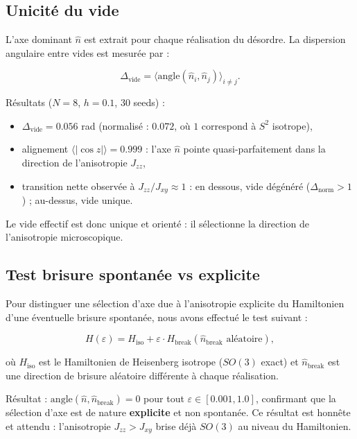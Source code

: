 \documentclass[11pt]{article}
\begin{document}
\subsection{Unicité du vide}

L'axe dominant $\hat{n}$ est extrait pour chaque réalisation du désordre. La dispersion angulaire entre vides est mesurée par :

\[
\Delta_{\mathrm{vide}} = \langle \mathrm{angle}(\hat{n}_i, \hat{n}_j) \rangle_{i \neq j}.
\]

Résultats ($N=8$, $h=0.1$, 30 seeds) :

\begin{itemize}
\item $\Delta_{\mathrm{vide}} = 0.056$ rad (normalisé : $0.072$, où $1$ correspond à $S^2$ isotrope),
\item alignement $\langle |\cos z| \rangle = 0.999$ : l'axe $\hat{n}$ pointe quasi-parfaitement dans la direction de l'anisotropie $J_{zz}$,
\item transition nette observée à $J_{zz}/J_{xy} \approx 1$ : en dessous, vide dégénéré ($\Delta_{\mathrm{norm}} > 1$) ; au-dessus, vide unique.
\end{itemize}

Le vide effectif est donc unique et orienté : il sélectionne la direction de l'anisotropie microscopique.

\subsection{Test brisure spontanée vs explicite}

Pour distinguer une sélection d'axe due à l'anisotropie explicite du Hamiltonien d'une éventuelle brisure spontanée, nous avons effectué le test suivant :

\[
H(\varepsilon) = H_{\mathrm{iso}} + \varepsilon \cdot H_{\mathrm{break}}(\hat{n}_{\mathrm{break}} \text{ aléatoire}),
\]

où $H_{\mathrm{iso}}$ est le Hamiltonien de Heisenberg isotrope ($SO(3)$ exact) et $\hat{n}_{\mathrm{break}}$ est une direction de brisure aléatoire différente à chaque réalisation.

Résultat : $\mathrm{angle}(\hat{n}, \hat{n}_{\mathrm{break}}) = 0$ pour tout $\varepsilon \in [0.001, 1.0]$, confirmant que la sélection d'axe est de nature \textbf{explicite} et non spontanée. Ce résultat est honnête et attendu : l'anisotropie $J_{zz} > J_{xy}$ brise déjà $SO(3)$ au niveau du Hamiltonien.
\end{document}
